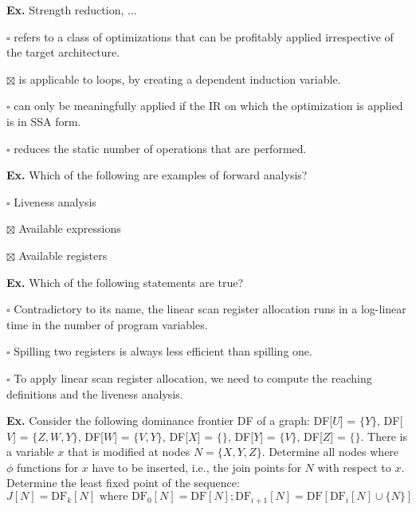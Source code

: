 \hrulefill

\textbf{Ex.} Strength reduction, ...
\begin{compactitem}
	\item[$\square$] refers to a class of optimizations that can be profitably applied irrespective of the target architecture.
	\item[$\boxtimes$] is applicable to loops, by creating a dependent induction variable.
	\item[$\square$] can only be meaningfully applied if the IR on which the optimization is applied is in SSA form.
	\item[$\square$] reduces the static number of operations that are performed.
\end{compactitem}

\hrulefill

\textbf{Ex.} Which of the following are examples of forward analysis?
\begin{compactitem}
	\item[$\square$] Liveness analysis
	\item[$\boxtimes$] Available expressions
	\item[$\boxtimes$] Available registers
\end{compactitem}

\hrulefill

\textbf{Ex.} Which of the following statements are true?
\begin{compactitem}
	\item[$\square$] Contradictory to its name, the linear scan register allocation runs in a log-linear time in the number of program variables.
	\item[$\square$] Spilling two registers is always less efficient than spilling one.
	\item[$\square$] To apply linear scan register allocation, we need to compute the reaching definitions and the liveness analysis.
\end{compactitem}

\hrulefill

\textbf{Ex.} Consider the following dominance frontier DF of a graph:
DF[$ U $] = $\{ Y \}$,
DF[$ V $] = $\{ Z, W, Y \}$,
DF[$ W $] = $\{ V, Y \}$,
DF[$ X $] = $\{  \}$,
DF[$ Y $] = $\{ V \}$,
DF[$ Z $] = $\{  \}$.
There is a variable $x$ that is modified at nodes $N = \{X, Y, Z\}$. Determine all nodes
where $\phi$ functions for $x$ have to be inserted, i.e., the join points for $N$ with respect to $x$.
Determine the least fixed point of the sequence:
$$J[N] = \text{DF}_k[N] \text{ where } \text{DF}_0[N] = \text{DF}[N]; \text{DF}_{i+1}[N] = \text{DF}[\text{DF}_i[N] \cup \{N\}]$$\smallskip

